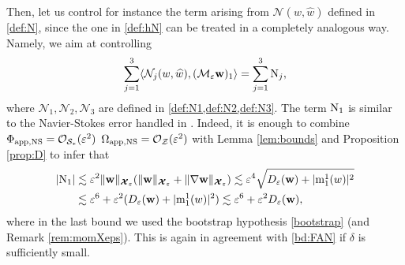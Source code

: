 \documentclass[11pt,reqno,a4paper]{amsart}
\def\eps{\varepsilon}
\newcommand{\cM}{\mathcal{M}}
\newcommand{\cN}{\mathcal{N}}
\newcommand{\cO}{\mathcal{O}}
\newcommand{\cS}{\mathcal{S}}
\newcommand{\cX}{\mathcal{X}}
\newcommand{\cZ}{\mathcal{Z}}
\newcommand{\mrm}{\mathrm{m}}
\newcommand{\1}{\mathbbm{1}}
\theoremstyle{definition}
\theoremstyle{definition}
\numberwithin{equation}{section}
\begin{document}
Then, let us control for instance the term arising from $\cN(w,\widehat{w})$ defined in \cref{def:N}, since the one in \cref{def:hN} can be treated in a completely analogous way. Namely, we aim at controlling
\begin{align}
    \sum_{j=1}^3\langle \cN_j(w,\widehat{w}),(\cM_\eps {
    \mathbf w})_1\rangle=\sum_{j=1}^3 {\rm N}_j, 
\end{align}
where $\cN_1,\cN_2,\cN_3$ are defined in \cref{def:N1,def:N2,def:N3}.
The term ${\rm N}_1$ is similar to the Navier-Stokes error handled in \cite{dolce2024long}. Indeed, it is enough to combine $\Phi_{\rm app, NS}=\cO_{\cS_*}(\eps^2)$  $\Omega_{\rm app, NS}=\cO_{\cZ}(\eps^2)$ with  Lemma \ref{lem:bounds} and Proposition \ref{prop:D} to infer that 
\begin{align}
    |{\rm N}_1|&\lesssim \eps^2 \|{\mathbf w}\|_{\boldsymbol{\cX}_\eps}(\|{\mathbf w}\|_{\boldsymbol{\cX}_\eps}+\|{\nabla\mathbf w}\|_{\boldsymbol{\cX}_\eps})\lesssim \eps^4\sqrt{D_{\eps}({\mathbf w})+|\mrm_1^1(w)|^2}\\
    &\lesssim \eps^6+\eps^2(D_{\eps}({\mathbf w})+|\mrm_1^1(w)|^2)\lesssim \eps^6+\eps^2D_{\eps}({\mathbf w}),
\end{align}
where in the last bound we used the bootstrap hypothesis \cref{bootstrap} (and Remark \ref{rem:momXeps}). This  is again in agreement with \cref{bd:FAN} if  $\delta$ is sufficiently small.
 
\end{document}
